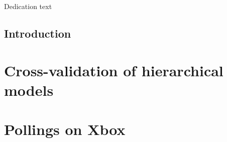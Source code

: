 \documentclass[11pt,openright,twoside,letterpaper,onecolumn]{report} %
\begin{document}
\pagestyle{empty}

\thesistitlepage
\thesiscopyrightpage

\thesisabstract


\pagestyle{plain}

\setlength{\footskip}{0.5in}

\setcounter{tocdepth}{2}
\renewcommand{\contentsname}{Table of Contents}
\tableofcontents
\cleardoublepage

\listoffigures
\cleardoublepage

\listoftables 
\cleardoublepage


\cleardoublepage

\thispagestyle{plain}
\strut \vfill
\centerline{\LARGE 
Dedication text
}
\vfill \strut
\cleardoublepage


\pagestyle{headings}

%
%
\setlength{\textheight}{8.5in}
\setlength{\footskip}{0in}

 {%
\fancyhf{}
\fancyhead[LE,RO]{\thepage}
\fancyhead[RE,LO]{\itshape \leftmark}
\renewcommand{\headrulewidth}{0pt}
}
\pagestyle{plain}

\chapter{Introduction}
\label{section:intro}


\part{Cross-validation of hierarchical models}
\label{sec:xval}


\part{Pollings on Xbox}
\label{sec:xbox}

\end{document}
